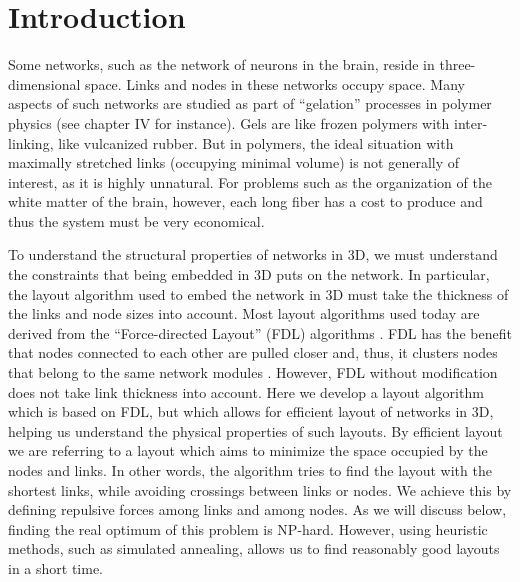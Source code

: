\documentclass[endfloats,nofootinbib,preprint,floatfix,titlepage,superscriptaddress,linenumbers]{revtex4-1} %
\begin{document}
\tableofcontents


\section{Introduction}
Some networks, such as the network of neurons in the brain, reside in three-dimensional space. 
Links and nodes in these networks occupy space. 
Many aspects of such networks are studied  as part of ``gelation'' processes in polymer physics (see \citep{de1979scaling} chapter IV for instance). 
Gels are like frozen polymers with inter-linking, like vulcanized rubber. But in polymers, the ideal situation with maximally stretched links (occupying minimal volume) is not generally of interest, as it is highly unnatural. 
For problems such as the organization of the white matter of the brain, however, each long fiber has a cost to produce and thus the system must be very economical.

To understand the structural properties of networks in 3D, we must understand the constraints that being embedded in 3D puts on the network. 
In particular, the layout algorithm used to embed the network in 3D must take the thickness of the links and node sizes into account. 
Most layout algorithms used today are derived from the ``Force-directed Layout'' (FDL) algorithms \citep{davidson1996drawing,kamada1989algorithm}. 
FDL has the benefit that nodes connected to each other are pulled closer and, thus, it clusters nodes that belong to the same network modules \citep{noack2009modularity}. 
However, FDL without modification does not take link thickness into account. 
Here we develop a layout algorithm which is based on FDL, but which allows for efficient layout of networks in 3D, helping us understand the physical properties of such layouts.
By efficient layout we are referring to a layout which aims to minimize the space occupied by the nodes and links. 
In other words, the algorithm tries to find the layout with the shortest links, while avoiding crossings between links or nodes.
We achieve this by defining repulsive forces among links and among nodes. 
As we will discuss below, finding the real optimum of this problem is NP-hard. 
However, using heuristic methods, such as simulated annealing, allows us to find reasonably good layouts in a short time.  
\end{document}
